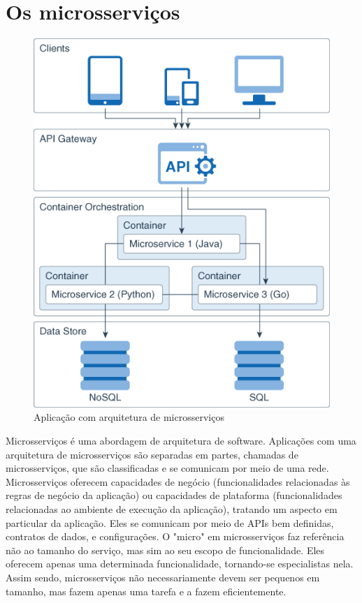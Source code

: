 \section{Os microsserviços}

\begin{figure}[htb]
	\caption{\label{figura_arquitetura_microsservicos}Aplicação com arquitetura de microsserviços}
	\begin{center}
	    \includegraphics[scale=0.5]{Imagens/microservice_architecture.png}
	\end{center}
\end{figure}

Microsserviços é uma abordagem de arquitetura de software. Aplicações com uma arquitetura de microsserviços são separadas em partes, chamadas de microsserviços, que são classificadas e se comunicam por meio de uma rede. Microsserviços oferecem capacidades de negócio (funcionalidades relacionadas às regras de negócio da aplicação) ou capacidades de plataforma (funcionalidades relacionadas ao ambiente de execução da aplicação), tratando um aspecto em particular da aplicação. Eles se comunicam por meio de APIs bem definidas, contratos de dados, e configurações. O "micro" em microsserviços faz referência não ao tamanho do serviço, mas sim ao seu escopo de funcionalidade. Eles oferecem apenas uma determinada funcionalidade, tornando-se especialistas nela. Assim sendo, microsserviços não necessariamente devem ser pequenos em tamanho, mas fazem apenas uma tarefa e a fazem eficientemente. \cite{Familiar2015}
 
